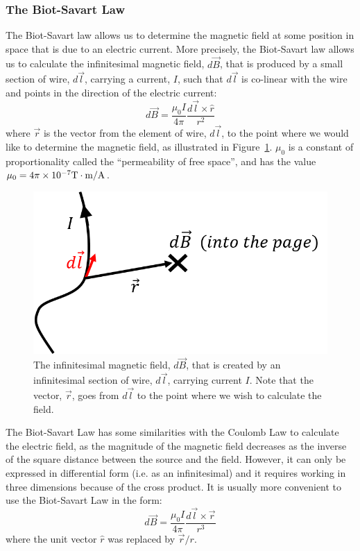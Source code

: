 \subsubsection{The Biot-Savart Law}

The Biot-Savart law allows us to determine the magnetic field at some position in space that is due to an electric current. More precisely, the Biot-Savart law allows us to calculate the infinitesimal magnetic field, $d\vec B$, that is produced by a small section of wire, $d\vec l$, carrying a current, $I$, such that $d\vec l$ is co-linear with the wire and points in the direction of the electric current:
\begin{equation}
\boxed{d\vec B = \frac{\mu_0 I}{4\pi}\frac{d\vec l\times \hat r}{r^2}}
\end{equation}
where $\vec r$ is the vector from the element of wire, $d\vec l$, to the point where we would like to determine the magnetic field, as illustrated in Figure~\ref{fig:magneticsource:biotsavart}. $\mu_0$ is a constant of proportionality called the ``permeability of free space'', and has the value $\mu_0=4\pi \times 10^{ -7} {\rm T\cdot m/A}$.

\begin{figure}[!htbp]
\centering
\includegraphics[width=0.5\linewidth]{files/biotsavart-37ffa7dec2527c7a20273b520610411d.png}
\caption[]{The infinitesimal magnetic field, $d\vec B$, that is created by an infinitesimal section of wire, $d\vec l$, carrying current $I$. Note that the vector, $\vec r$, goes from $d\vec l$ to the point where we wish to calculate the field.}
\label{fig:magneticsource:biotsavart}
\end{figure}

The Biot-Savart Law has some similarities with the Coulomb Law to calculate the electric field, as the magnitude of the magnetic field decreases as the inverse of the square distance between the source and the field. However, it can only be expressed in differential form (i.e. as an infinitesimal) and it requires working in three dimensions because of the cross product. It is usually more convenient to use the Biot-Savart Law in the form:
\begin{equation}
d\vec B = \frac{\mu_0 I}{4\pi}\frac{d\vec l\times \vec r}{r^3}
\end{equation}
where the unit vector $\hat r$ was replaced by $\vec r/r$.

